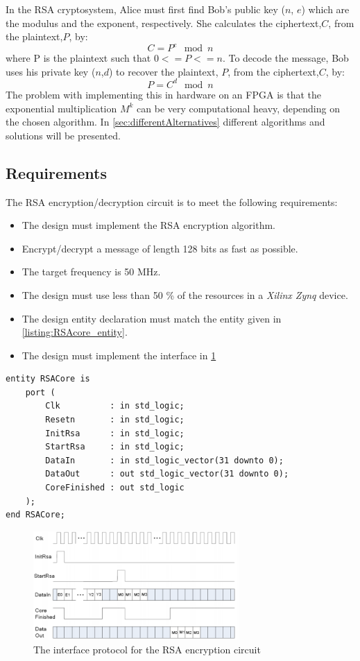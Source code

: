 %
In the RSA cryptosystem, Alice must first find Bob's public key ($n$, $e$) which are the modulus and the exponent, respectively. She calculates the ciphertext,$C$, from the plaintext,$P$, by: 
%
\begin{equation}
    C=P^e\mod{n}
\end{equation}
%
where P is the plaintext such that $0<=P<=n$. To decode the message, Bob uses his private key ($n$,$d$) to recover the plaintext, $P$, from the ciphertext,$C$, by:
%
\begin{equation}
    P=C^d\mod{n}
\end{equation}
%
The problem with implementing this in hardware on an FPGA is that the exponential multiplication
$M^k$ can be very computational heavy, depending on the chosen algorithm. In \cref{sec:differentAlternatives} different algorithms and solutions will be presented.
%
%
\subsection{Requirements}
%
The RSA encryption/decryption circuit is to meet the following requirements:
%
\begin{itemize}
    \item The design must implement the RSA encryption algorithm.
    \item Encrypt/decrypt a message of length 128 bits as fast as possible.
    \item The target frequency is 50 MHz.
    \item The design must use less than 50 \% of the resources in a
        \emph{Xilinx Zynq} device.
    \item The design entity declaration must match the entity given in \cref{listing:RSAcore_entity}.
    \item The design must implement the interface in \cref{fig:interface_protocol}
\end{itemize}
%
\begin{lstlisting}[caption=Entity declaration, label=listing:RSAcore_entity]
entity RSACore is
    port (
        Clk          : in std_logic;
        Resetn       : in std_logic;
        InitRsa      : in std_logic;
        StartRsa     : in std_logic;
        DataIn       : in std_logic_vector(31 downto 0);
        DataOut      : out std_logic_vector(31 downto 0);
        CoreFinished : out std_logic
    );
end RSACore;
\end{lstlisting}
%
\begin{figure}[htp]
    \centering
    \includegraphics[width=0.7\textwidth]{images/interface_protocol}
    \caption{The interface protocol for the RSA encryption circuit}
    \label{fig:interface_protocol}
\end{figure}
%
%
